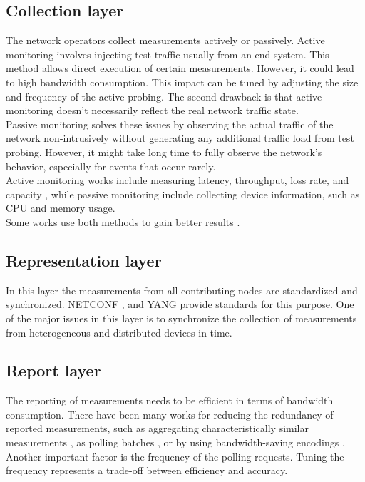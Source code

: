 \subsection{Collection layer}
The network operators collect measurements actively or passively.
Active monitoring involves injecting test traffic usually from an end-system.
This method allows direct execution of certain measurements. However, it could lead to high bandwidth consumption.
This impact can be tuned by adjusting the size and frequency of the active probing.
The second drawback is that active monitoring doesn't necessarily reflect the real network traffic state.\\
Passive monitoring solves these issues by observing the actual traffic of the network non-intrusively
without generating any additional traffic load from test probing. However, it might take long time to fully observe
the network's behavior, especially for events that occur rarely.\\
Active monitoring works include measuring latency, throughput, loss rate, and capacity \cite{5412871},
while passive monitoring include collecting device information, such as CPU and memory usage.\\
Some works use both methods to gain better results \cite{1440821} \cite{5453662}.

\subsection{Representation layer}
In this layer the measurements from all contributing nodes are standardized and synchronized.
NETCONF \cite{hjpdocRF32}, and YANG \cite{hjpdocRF41} provide standards for this purpose.
One of the major issues in this layer is to synchronize the collection of measurements from heterogeneous and distributed
devices in time.\\

\subsection{Report layer}
The reporting of measurements needs to be efficient in terms of bandwidth consumption.
There have been many works for reducing the redundancy of reported measurements,
such as aggregating characteristically similar measurements , as polling batches \cite{cheikhrouhou2000efficient},
or by using bandwidth-saving encodings \cite{claise2008specification}.\\ Another important factor is the frequency of the polling requests.
Tuning the frequency represents a trade-off between efficiency and accuracy.\\

